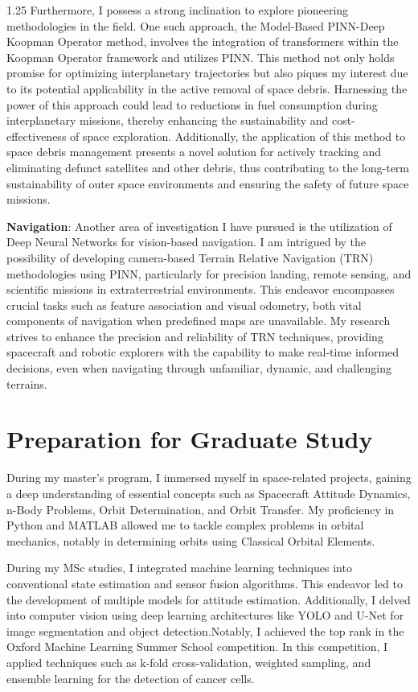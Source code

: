 \documentclass[a4paper,12pt]{article}
\begin{document}
\begin{spacing}{1.25}
Furthermore, I possess a strong inclination to explore pioneering methodologies in the field. One such approach, the Model-Based PINN-Deep Koopman Operator method, involves the integration of transformers within the Koopman Operator framework and utilizes PINN. This method not only holds promise for optimizing interplanetary trajectories but also piques my interest due to its potential applicability in the active removal of space debris. Harnessing the power of this approach could lead to reductions in fuel consumption during interplanetary missions, thereby enhancing the sustainability and cost-effectiveness of space exploration. Additionally, the application of this method to space debris management presents a novel solution for actively tracking and eliminating defunct satellites and other debris, thus contributing to the long-term sustainability of outer space environments and ensuring the safety of future space missions.


\textbf{Navigation}: Another area of investigation I have pursued is the utilization of Deep Neural Networks for vision-based navigation. I am intrigued by the possibility of developing camera-based Terrain Relative Navigation (TRN) methodologies using PINN, particularly for precision landing, remote sensing, and scientific missions in extraterrestrial environments. This endeavor encompasses crucial tasks such as feature association and visual odometry, both vital components of navigation when predefined maps are unavailable. My research strives to enhance the precision and reliability of TRN techniques, providing spacecraft and robotic explorers with the capability to make real-time informed decisions, even when navigating through unfamiliar, dynamic, and challenging terrains.


\section{Preparation for Graduate Study}
During my master's program, I immersed myself in space-related projects, gaining a deep understanding of essential concepts such as Spacecraft Attitude Dynamics, n-Body Problems, Orbit Determination, and Orbit Transfer. My proficiency in Python and MATLAB allowed me to tackle complex problems in orbital mechanics, notably in determining orbits using Classical Orbital Elements.

During my MSc studies, I integrated machine learning techniques into conventional state estimation and sensor fusion algorithms. This endeavor led to the development of multiple models for attitude estimation. Additionally, I delved into computer vision using deep learning architectures like YOLO and U-Net for image segmentation and object detection.Notably, I achieved the top rank in the Oxford Machine Learning Summer School competition. In this competition, I applied techniques such as k-fold cross-validation, weighted sampling, and ensemble learning for the detection of cancer cells.


\end{spacing}
\end{document}
